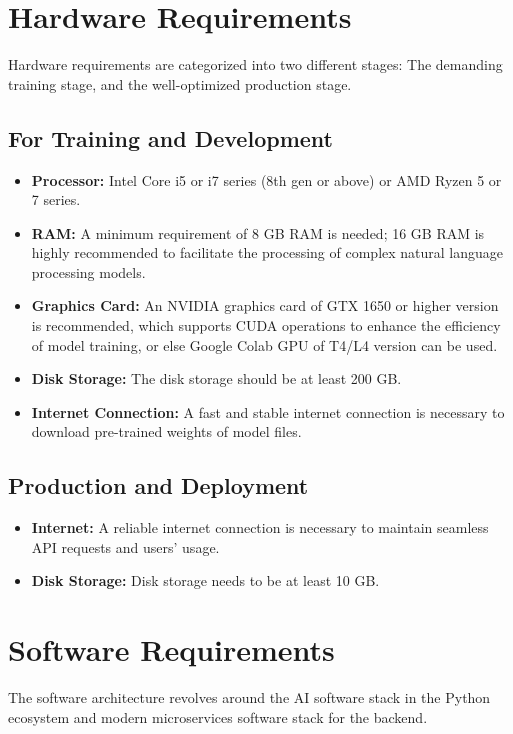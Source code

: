 \section{Hardware Requirements}
Hardware requirements are categorized into two different stages: The demanding training stage, and the well-optimized production stage.

\subsection{For Training and Development}
\begin{itemize}
	\item \textbf{Processor:} Intel Core i5 or i7 series (8th gen or above) or AMD Ryzen 5 or 7 series.
	\item \textbf{RAM:} A minimum requirement of 8 GB RAM is needed; 16 GB RAM is highly recommended to facilitate the processing of complex natural language processing models.
	\item \textbf{Graphics Card:} An NVIDIA graphics card of GTX 1650 or higher version is recommended, which supports CUDA operations to enhance the efficiency of model training, or else Google Colab GPU of T4/L4 version can be used.
	\item \textbf{Disk Storage:} The disk storage should be at least 200 GB.
	\item \textbf{Internet Connection:} A fast and stable internet connection is necessary to download pre-trained weights of model files.
\end{itemize}

\subsection{Production and Deployment}
\begin{itemize}
	\item \textbf{Internet:} A reliable internet connection is necessary to maintain seamless API requests and users' usage.
	\item \textbf{Disk Storage:} Disk storage needs to be at least 10 GB.
\end{itemize}

\section{Software Requirements}
The software architecture revolves around the AI software stack in the Python ecosystem and modern microservices software stack for the backend.

